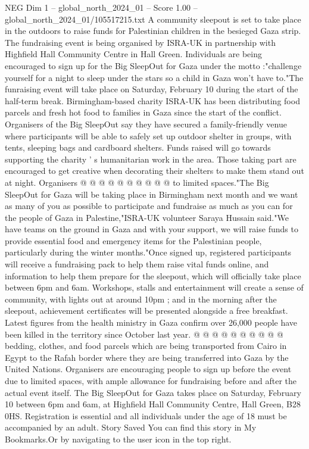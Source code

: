 \begin{textsample}{NEG Dim 1 – global\_north\_2024\_01 – Score 1.00 – global\_north\_2024\_01/105517215.txt}  \label{ex:f1_neg_336}
A community sleepout is set to take place in the outdoors to raise funds for Palestinian children in the besieged Gaza strip.
The fundraising event is being organised by ISRA-UK in partnership with Highfield Hall Community Centre in Hall Green.
Individuals are being encouraged to sign up for the Big SleepOut for Gaza under the motto :"challenge yourself for a night to sleep under the stars so a child in Gaza won't have to."The funraising event will take place on Saturday, February 10 during the start of the half-term break.
Birmingham-based charity ISRA-UK has been distributing food parcels and fresh hot food to families in Gaza since the start of the conflict.
Organisers of the Big SleepOut say they have secured a family-friendly venue where participants will be able to safely set up outdoor shelter in groups, with tents, sleeping bags and cardboard shelters.
Funds raised will go towards supporting the charity ' s humanitarian work in the area.
Those taking part are encouraged to get creative when decorating their shelters to make them stand out at night.
Organisers @ @ @ @ @ @ @ @ @ @ to limited spaces."The Big SleepOut for Gaza will be taking place in Birmingham next month and we want as many of you as possible to participate and fundraise as much as you can for the people of Gaza in Palestine,"ISRA-UK volunteer Saraya Hussain said."We have teams on the ground in Gaza and with your support, we will raise funds to provide essential food and emergency items for the Palestinian people, particularly during the winter months."Once signed up, registered participants will receive a fundraising pack to help them raise vital funds online, and information to help them prepare for the sleepout, which will officially take place between 6pm and 6am.
Workshops, stalls and entertainment will create a sense of community, with lights out at around 10pm ; and in the morning after the sleepout, achievement certificates will be presented alongside a free breakfast.
Latest figures from the health ministry in Gaza confirm over 26,000 people have been killed in the territory since October last year. @ @ @ @ @ @ @ @ @ @ bedding, clothes, and food parcels which are being transported from Cairo in Egypt to the Rafah border where they are being transferred into Gaza by the United Nations.
Organisers are encouraging people to sign up before the event due to limited spaces, with ample allowance for fundraising before and after the actual event itself.
The Big SleepOut for Gaza takes place on Saturday, February 10 between 6pm and 6am, at Highfield Hall Community Centre, Hall Green, B28 0HS.
Registration is essential and all individuals under the age of 18 must be accompanied by an adult.
Story Saved You can find this story in My Bookmarks.Or by navigating to the user icon in the top right.

\end{textsample}
